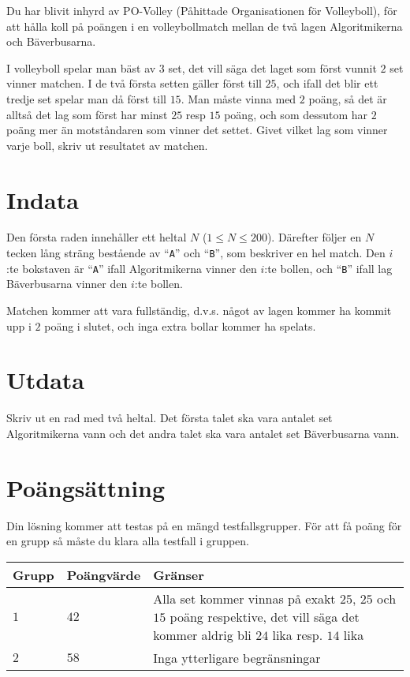Du har blivit inhyrd av PO-Volley (Påhittade Organisationen för Volleyboll),
för att hålla koll på poängen i en volleybollmatch mellan de två lagen Algoritmikerna och Bäverbusarna.

I volleyboll spelar man bäst av $3$ set, det vill säga det laget
som först vunnit $2$ set vinner matchen. I de två första setten gäller först
till $25$, och ifall det blir ett tredje set spelar man då först till $15$.
Man måste vinna med $2$ poäng, så det är alltså det lag som först har
minst $25$ resp $15$ poäng, och som dessutom har $2$ poäng mer än motståndaren
som vinner det settet. Givet vilket lag som vinner varje boll, skriv ut resultatet av matchen.

\section*{Indata}
Den första raden innehåller ett heltal $N$ ($1 \le N \le 200$).
Därefter följer en $N$ tecken lång sträng bestående av ``\texttt{A}'' och ``\texttt{B}'', som beskriver en hel match.
Den $i$:te bokstaven är ``\texttt{A}'' ifall Algoritmikerna vinner den $i$:te bollen, och ``\texttt{B}'' ifall lag Bäverbusarna vinner den $i$:te bollen.

Matchen kommer att vara fullständig, d.v.s. något av lagen kommer ha kommit upp i $2$ poäng i slutet, och inga extra bollar kommer ha spelats.

\section*{Utdata}
Skriv ut en rad med två heltal. Det första talet ska vara antalet set Algoritmikerna vann
och det andra talet ska vara antalet set Bäverbusarna vann.

\section*{Poängsättning}
Din lösning kommer att testas på en mängd testfallsgrupper.
För att få poäng för en grupp så måste du klara alla testfall i gruppen.

\noindent
\begin{tabular}{| l | l | l |}
\hline
Grupp & Poängvärde & Gränser \\ \hline
$1$    & $42$          &  Alla set kommer vinnas på exakt $25$, $25$ och $15$ poäng respektive, det vill säga det kommer aldrig bli $24$ lika resp. $14$ lika\\ \hline 
$2$    & $58$          &  Inga ytterligare begränsningar \\ \hline
\end{tabular}

